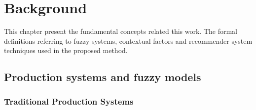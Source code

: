 
\chapter{Background}

This chapter present the fundamental concepts related this work. The
formal definitions referring to fuzzy systems, contextual factors and
recommender system techniques used in the proposed method.
\section{Production systems and fuzzy models}

\subsection{Traditional Production Systems}

